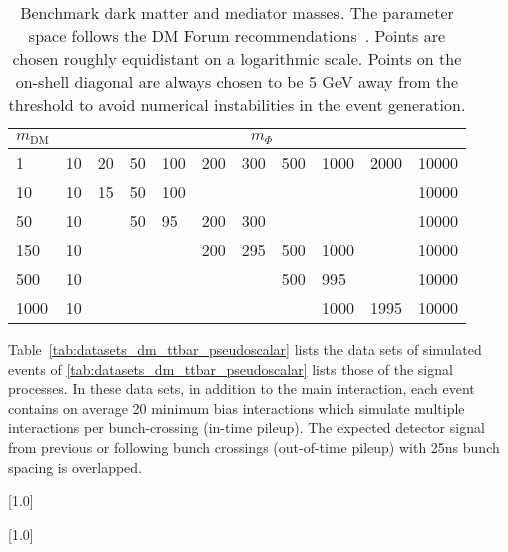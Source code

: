 \begin{table}[h!] \centering \begin{tabular}{l|llllllllll}\hline \hline
$m_\textrm{DM}$  & \multicolumn{10}{c}{$m_\Phi$}
\\ \hline 1    & 10 & 20 & 50 & 100 & 200 & 300 & 500 & 1000 & 2000 & 10000 \\
10   & 10 & 15 & 50 & 100 &     &     &     &      &      & 10000 \\ 50   & 10 &
& 50 & 95  & 200 & 300 &     &      &      & 10000 \\ 150  & 10 &    &    &
& 200 & 295 & 500 & 1000 &      & 10000 \\ 500  & 10 &    &    &     &     &
& 500 & 995  &      & 10000 \\ 1000 & 10 &    &    &     &     &     &     &
1000 & 1995 & 10000\\ \hline \hline \end{tabular} \caption{Benchmark dark
matter and mediator masses. The parameter space follows the
DM Forum recommendations~\cite{Abercrombie:2015wmb}. Points are chosen roughly
equidistant on a logarithmic scale. Points on the on-shell diagonal are always 
chosen to be 5 GeV away from the threshold to avoid numerical instabilities in 
the event generation.} \label{tab:DMgrid} \end{table}


\dub

Table~\ref{tab:datasets_dm_ttbar_pseudoscalar} lists the data sets of simulated events of
\ref{tab:datasets_dm_ttbar_pseudoscalar} lists those of the signal
processes. In these data sets, in addition to the main interaction, each
event contains on average 20 minimum bias interactions which simulate
multiple interactions per bunch-crossing (in-time pileup). The expected
detector signal from previous or following bunch crossings (out-of-time
pileup) with 25ns bunch spacing is overlapped.

\begin{table}[!p]
 \centering
{}
 \scriptsize
 \scalebox{.7}[1.0]{}
\label{datasets_dm_vector}
\end{table}

\begin{table}[!p]
 \centering
{}
 \tiny
 \scalebox{.7}[1.0]{}
\label{datasets_dm_axial}
\end{table}

